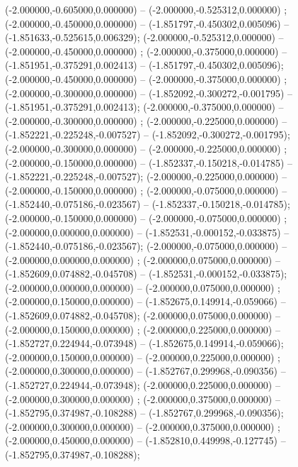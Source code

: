  (-2.000000,-0.605000,0.000000) -- (-2.000000,-0.525312,0.000000) ;
 (-2.000000,-0.450000,0.000000) -- (-1.851797,-0.450302,0.005096) -- (-1.851633,-0.525615,0.006329);
 (-2.000000,-0.525312,0.000000) -- (-2.000000,-0.450000,0.000000) ;
 (-2.000000,-0.375000,0.000000) -- (-1.851951,-0.375291,0.002413) -- (-1.851797,-0.450302,0.005096);
 (-2.000000,-0.450000,0.000000) -- (-2.000000,-0.375000,0.000000) ;
 (-2.000000,-0.300000,0.000000) -- (-1.852092,-0.300272,-0.001795) -- (-1.851951,-0.375291,0.002413);
 (-2.000000,-0.375000,0.000000) -- (-2.000000,-0.300000,0.000000) ;
 (-2.000000,-0.225000,0.000000) -- (-1.852221,-0.225248,-0.007527) -- (-1.852092,-0.300272,-0.001795);
 (-2.000000,-0.300000,0.000000) -- (-2.000000,-0.225000,0.000000) ;
 (-2.000000,-0.150000,0.000000) -- (-1.852337,-0.150218,-0.014785) -- (-1.852221,-0.225248,-0.007527);
 (-2.000000,-0.225000,0.000000) -- (-2.000000,-0.150000,0.000000) ;
 (-2.000000,-0.075000,0.000000) -- (-1.852440,-0.075186,-0.023567) -- (-1.852337,-0.150218,-0.014785);
 (-2.000000,-0.150000,0.000000) -- (-2.000000,-0.075000,0.000000) ;
 (-2.000000,0.000000,0.000000) -- (-1.852531,-0.000152,-0.033875) -- (-1.852440,-0.075186,-0.023567);
 (-2.000000,-0.075000,0.000000) -- (-2.000000,0.000000,0.000000) ;
 (-2.000000,0.075000,0.000000) -- (-1.852609,0.074882,-0.045708) -- (-1.852531,-0.000152,-0.033875);
 (-2.000000,0.000000,0.000000) -- (-2.000000,0.075000,0.000000) ;
 (-2.000000,0.150000,0.000000) -- (-1.852675,0.149914,-0.059066) -- (-1.852609,0.074882,-0.045708);
 (-2.000000,0.075000,0.000000) -- (-2.000000,0.150000,0.000000) ;
 (-2.000000,0.225000,0.000000) -- (-1.852727,0.224944,-0.073948) -- (-1.852675,0.149914,-0.059066);
 (-2.000000,0.150000,0.000000) -- (-2.000000,0.225000,0.000000) ;
 (-2.000000,0.300000,0.000000) -- (-1.852767,0.299968,-0.090356) -- (-1.852727,0.224944,-0.073948);
 (-2.000000,0.225000,0.000000) -- (-2.000000,0.300000,0.000000) ;
 (-2.000000,0.375000,0.000000) -- (-1.852795,0.374987,-0.108288) -- (-1.852767,0.299968,-0.090356);
 (-2.000000,0.300000,0.000000) -- (-2.000000,0.375000,0.000000) ;
 (-2.000000,0.450000,0.000000) -- (-1.852810,0.449998,-0.127745) -- (-1.852795,0.374987,-0.108288);
